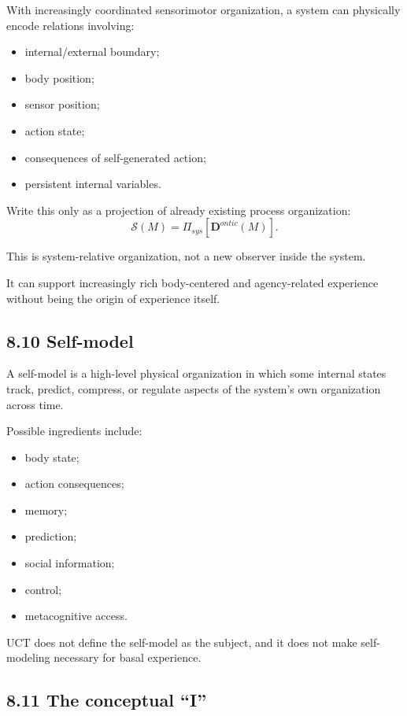 \documentclass[
  11pt,
  a4paper,
]{article}
\providecommand{\tightlist}{%
  \setlength{\itemsep}{0pt}\setlength{\parskip}{0pt}}
\begin{document}
With increasingly coordinated sensorimotor organization, a system can
physically encode relations involving:

\begin{itemize}
\tightlist
\item
  internal/external boundary;
\item
  body position;
\item
  sensor position;
\item
  action state;
\item
  consequences of self-generated action;
\item
  persistent internal variables.
\end{itemize}

Write this only as a projection of already existing process
organization:
\nopagebreak[4]
\[
\mathcal S(M)
=
\Pi_{sys}
[
\mathbf D^{ontic}(M)
].
\]

This is system-relative organization, not a new observer inside the
system.

It can support increasingly rich body-centered and agency-related
experience without being the origin of experience itself.

\hypertarget{self-model}{%
\subsection{8.10 Self-model}\label{self-model}}

A self-model is a high-level physical organization in which some
internal states track, predict, compress, or regulate aspects of the
system's own organization across time.

Possible ingredients include:

\begin{itemize}
\tightlist
\item
  body state;
\item
  action consequences;
\item
  memory;
\item
  prediction;
\item
  social information;
\item
  control;
\item
  metacognitive access.
\end{itemize}

UCT does not define the self-model as the subject, and it does not make
self-modeling necessary for basal experience.

\hypertarget{the-conceptual-i}{%
\subsection{8.11 The conceptual ``I''}\label{the-conceptual-i}}
\end{document}
